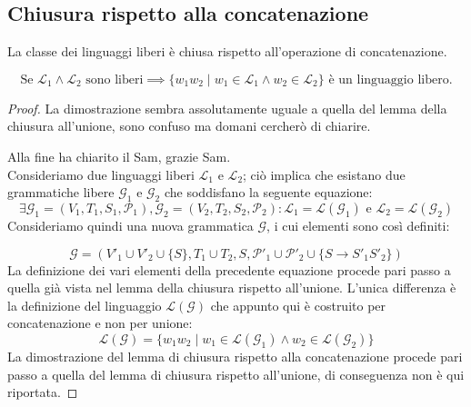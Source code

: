 \documentclass[class=book, crop=false, oneside, 12pt]{standalone}
\begin{document}
\subsection*{Chiusura rispetto alla concatenazione}

\begin{lemma}
  La classe dei linguaggi liberi è chiusa rispetto all'operazione di concatenazione.

  \begin{equation*}
    \textrm{Se } \mathcal{L}_1 \land \mathcal{L}_2 \textrm{ sono liberi} \implies \{w_1w_2 \mid w_1 \in \mathcal{L}_1 \land w_2 \in \mathcal{L}_2\} \textrm{ è un linguaggio libero.}
  \end{equation*}

\end{lemma}

\begin{proof}
  La dimostrazione sembra assolutamente uguale a quella del lemma della chiusura all'unione, sono confuso ma domani cercherò di chiarire.
  
  Alla fine ha chiarito il Sam, grazie Sam.\\
  Consideriamo due linguaggi liberi \(\mathcal{L}_1\) e \(\mathcal{L}_2\); ciò implica che esistano due grammatiche libere \(\mathcal{G}_1\) e \(\mathcal{G}_2\) che soddisfano la seguente equazione:
  \begin{equation*}
    \exists \mathcal{G}_1 = (V_1, T_1, S_1, \mathcal{P}_1), \mathcal{G}_2 = (V_2, T_2, S_2, \mathcal{P}_2) : \mathcal{L}_1 = \mathcal{L}(\mathcal{G}_1) \textrm{ e } \mathcal{L}_2 = \mathcal{L}(\mathcal{G}_2)
  \end{equation*}
  Consideriamo quindi una nuova grammatica \(\mathcal{G}\), i cui elementi sono così definiti:

  \begin{equation*}
      \mathcal{G} = (V'_1 \cup V'_2 \cup \{S\}, T_1 \cup T_2, S, \mathcal{P}'_1 \cup \mathcal{P}'_2 \cup \{S \rightarrow S'_1 S'_2\})
  \end{equation*}
  La definizione dei vari elementi della precedente equazione procede pari passo a quella già vista nel lemma della chiusura rispetto all'unione.
  L'unica differenza è la definizione del linguaggio \(\mathcal{L}(\mathcal{G})\) che appunto qui è costruito per concatenazione e non per unione:
  \begin{equation*}
    \mathcal{L(G)} = \{w_1 w_2 \mid w_1 \in \mathcal{L(G_1)} \land w_2 \in \mathcal{L(G_2)} \}
  \end{equation*}
  La dimostrazione del lemma di chiusura rispetto alla concatenazione procede pari passo a quella del lemma di chiusura rispetto all'unione, di conseguenza non è qui riportata. 
\end{proof}
\end{document}
